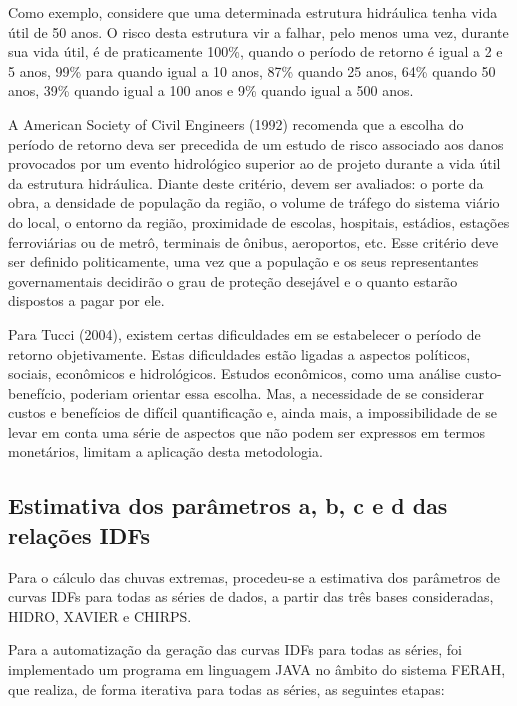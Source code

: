 \documentclass[
]{agujournal2019}
\begin{document}
Como exemplo, considere que uma determinada estrutura hidráulica tenha
vida útil de 50 anos. O risco desta estrutura vir a falhar, pelo menos
uma vez, durante sua vida útil, é de praticamente 100\%, quando o
período de retorno é igual a 2 e 5 anos, 99\% para quando igual a 10
anos, 87\% quando 25 anos, 64\% quando 50 anos, 39\% quando igual a 100
anos e 9\% quando igual a 500 anos.

A American Society of Civil Engineers (1992) recomenda que a escolha do
período de retorno deva ser precedida de um estudo de risco associado
aos danos provocados por um evento hidrológico superior ao de projeto
durante a vida útil da estrutura hidráulica. Diante deste critério,
devem ser avaliados: o porte da obra, a densidade de população da
região, o volume de tráfego do sistema viário do local, o entorno da
região, proximidade de escolas, hospitais, estádios, estações
ferroviárias ou de metrô, terminais de ônibus, aeroportos, etc. Esse
critério deve ser definido politicamente, uma vez que a população e os
seus representantes governamentais decidirão o grau de proteção
desejável e o quanto estarão dispostos a pagar por ele.

Para Tucci (2004), existem certas dificuldades em se estabelecer o
período de retorno objetivamente. Estas dificuldades estão ligadas a
aspectos políticos, sociais, econômicos e hidrológicos. Estudos
econômicos, como uma análise custo-benefício, poderiam orientar essa
escolha. Mas, a necessidade de se considerar custos e benefícios de
difícil quantificação e, ainda mais, a impossibilidade de se levar em
conta uma série de aspectos que não podem ser expressos em termos
monetários, limitam a aplicação desta metodologia.

\subsection{Estimativa dos parâmetros a, b, c e d das relações
IDFs}\label{estimativa-dos-paruxe2metros-a-b-c-e-d-das-relauxe7uxf5es-idfs}

Para o cálculo das chuvas extremas, procedeu-se a estimativa dos
parâmetros de curvas IDFs para todas as séries de dados, a partir das
três bases consideradas, HIDRO, XAVIER e CHIRPS.

Para a automatização da geração das curvas IDFs para todas as séries,
foi implementado um programa em linguagem JAVA no âmbito do sistema
FERAH, que realiza, de forma iterativa para todas as séries, as
seguintes etapas:
\end{document}
